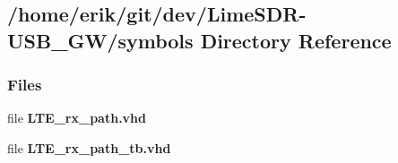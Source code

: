 \subsection{/home/erik/git/dev/\+Lime\+S\+D\+R-\/\+U\+S\+B\+\_\+\+G\+W/symbols Directory Reference}
\label{dir_18e55752bb429d60861827da0be8a34b}
\subsubsection*{Files}
\begin{DoxyCompactItemize}
\item 
file {\bf L\+T\+E\+\_\+rx\+\_\+path.\+vhd}
\item 
file {\bf L\+T\+E\+\_\+rx\+\_\+path\+\_\+tb.\+vhd}
\end{DoxyCompactItemize}
